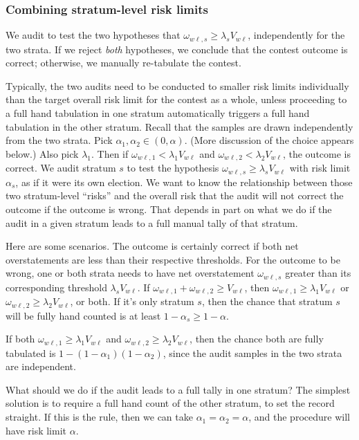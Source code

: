 \subsubsection{Combining stratum-level risk limits}\label{sec:stratumRisk}
We audit to test the two hypotheses that $\omega_{w\ell,s} \ge \lambda_s V_{w\ell}$, 
independently for the two strata.
If we reject \emph{both} hypotheses, we conclude that the contest outcome is correct;
otherwise, we manually re-tabulate the contest.

Typically, the two audits need to be conducted to smaller risk limits individually than the target overall
risk limit for the contest as a whole, unless proceeding to a full hand tabulation in one stratum
automatically triggers a full hand tabulation in the other stratum.
Recall that the samples are drawn independently from the two strata.
Pick $\alpha_1, \alpha_2 \in (0,\alpha)$.
(More discussion of the choice appears below.)
Also pick $\lambda_1$.
Then if $\omega_{w\ell,1} < \lambda_1 V_{w\ell}$ and 
$\omega_{w\ell,2} < \lambda_2 V_{w\ell}$,
the outcome is correct.
We audit stratum $s$ to test the hypothesis $\omega_{w\ell,s} \ge \lambda_s V_{w\ell}$ 
with risk limit $\alpha_s$,
as if it were its own election.
We want to know the relationship between those two stratum-level ``risks'' and the 
overall risk that the audit will not correct the outcome if the outcome is wrong.
That depends in part on what we do if the audit in a given stratum leads to a full manual
tally of that stratum.

Here are some scenarios.
The outcome is certainly correct if both net overstatements are less than their 
respective thresholds. 
For the outcome to be wrong, one or both strata needs to have net overstatement
$\omega_{w\ell,s}$
greater than its corresponding threshold $\lambda_s V_{w\ell}$.
If $\omega_{w\ell,1} + \omega_{w\ell,2} \ge V_{w\ell}$, then $\omega_{w\ell,1}\ge \lambda_1V_{w\ell}$
or $\omega_{w\ell,2}\ge \lambda_2V_{w\ell}$, or both.
If it's only stratum $s$, then the chance that stratum $s$ will be fully hand
counted is at least $1-\alpha_s \ge 1- \alpha$.

If both $\omega_{w\ell,1}\ge \lambda_1V_{w\ell}$
and $\omega_{w\ell,2}\ge \lambda_2V_{w\ell}$, then the chance both are fully tabulated is
$1-(1-\alpha_1)(1-\alpha_2)$, since the audit samples in the two strata are independent.

What should we do if the audit leads to a full tally in one stratum?
The simplest solution is to require a full hand count of the other stratum, to set the record straight.
If this is the rule, then we can take $\alpha_1 = \alpha_2 = \alpha$, and the procedure will have
risk limit $\alpha$.


